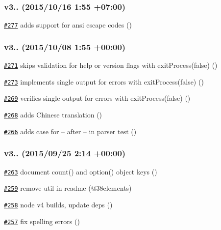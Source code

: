 \subsubsection*{v3.. (2015/10/16 1\+:55 +07\+:00)}


\begin{DoxyItemize}
\item \href{https://github.com/bcoe/yargs/pull/277}{\tt \#277} adds support for ansi escape codes ()
\end{DoxyItemize}

\subsubsection*{v3.. (2015/10/08 1\+:55 +00\+:00)}


\begin{DoxyItemize}
\item \href{https://github.com/bcoe/yargs/pull/273}{\tt \#271} skips validation for help or version flags with exit\+Process(false) ()
\item \href{https://github.com/bcoe/yargs/pull/273}{\tt \#273} implements single output for errors with exit\+Process(false) ()
\item \href{https://github.com/bcoe/yargs/pull/269}{\tt \#269} verifies single output for errors with exit\+Process(false) ()
\item \href{https://github.com/bcoe/yargs/pull/268}{\tt \#268} adds Chinese translation ()
\item \href{https://github.com/bcoe/yargs/pull/266}{\tt \#266} adds case for -- after -- in parser test ()
\end{DoxyItemize}

\subsubsection*{v3.. (2015/09/25 2\+:14 +00\+:00)}


\begin{DoxyItemize}
\item \href{https://github.com/bcoe/yargs/pull/263}{\tt \#263} document count() and option() object keys ()
\item \href{https://github.com/bcoe/yargs/pull/259}{\tt \#259} remove util in readme (@38elements)
\item \href{https://github.com/bcoe/yargs/pull/258}{\tt \#258} node v4 builds, update deps ()
\item \href{https://github.com/bcoe/yargs/pull/257}{\tt \#257} fix spelling errors ()
\end{DoxyItemize}

